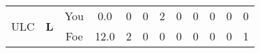 \documentclass[a4paper,12pt]{article}
\begin{document}
\begin{tabular}[t]{| c | c | c | c | c | c | c | c | c | c | c | c
      |}
        \hline
        \multirow{2}{*}{  ULC  } &
              \multirow{2}{*}{  \textbf{L}  } & 
                    \cellcolor{yellow!25} You & \cellcolor{yellow!25} 0.0 & \cellcolor{yellow!25} 0 &
                    \cellcolor{yellow!25} 0 & \cellcolor{yellow!25} 2 & \cellcolor{yellow!25} 0 &
                    \cellcolor{yellow!25} 0 & \cellcolor{yellow!25} 0 & \cellcolor{yellow!25} 0 &
                    \cellcolor{yellow!25} 0 \\
                    \cline{3-12}
                    & & \cellcolor{red!15} Foe & \cellcolor{red!15} 12.0 & \cellcolor{red!15} 2 & \cellcolor{red!15}
                    0 & \cellcolor{red!15} 0
                    & \cellcolor{red!15} 0 & \cellcolor{red!15}
                    0 & \cellcolor{red!15} 0 
                    & \cellcolor{red!15} 0 & \cellcolor{red!15}
                    1 \\
                    
                      
      
                      
      
                      
      
                      
      
                      
                        \hline
                      \end{tabular}
                      
\end{document}
